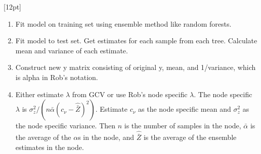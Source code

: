 [12pt]



\begin{enumerate}
\item Fit model on training set using ensemble method like random
forests.
\item Fit model to test set.  Get estimates for each sample from each
tree.  Calculate mean and variance of each estimate.
\item Construct new y matrix consisting of original y, mean, and
1/variance, which is alpha in Rob's notation.
\item Either estimate $\lambda$ from GCV or use Rob's node specific
  $\lambda$.  The node specific $\lambda$ is $\sigma^2_z/(n
  \bar{\alpha} (c_{\nu}-\hat{\bar{Z}})^2)$.  Estimate $c_{\nu}$ as the
  node specific mean and $\sigma^2_z$ as the node specific variance.
  Then $n$ is the number of samples in the node, $\bar{\alpha}$ is the
  average of the $\alpha$s in the node, and $\hat{\bar{Z}}$ is the
  average of the ensemble estimates in the node.
\end{enumerate}




